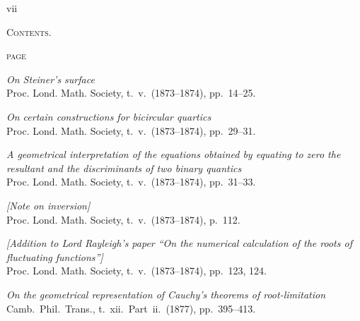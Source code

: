 \documentclass[11pt]{article}
\begin{document}
\thispagestyle{empty}
\begin{flushright}\small vii\end{flushright}
\vspace*{1em}
\begin{center}
{\Large\scshape Contents.}
\end{center}
\vspace*{1em}

\noindent\hfill\textsc{page}

\medskip

\begin{description}\itemsep=2pt
\item[556.] \textit{On Steiner's surface}\\
\hspace*{1em}\small Proc. Lond. Math. Society, t.~v.\ (1873--1874), pp.~14--25.

\item[557.] \textit{On certain constructions for bicircular quartics}\\
\hspace*{1em}\small Proc. Lond. Math. Society, t.~v.\ (1873--1874), pp.~29--31.

\item[558.] \textit{A geometrical interpretation of the equations obtained by equating to zero the resultant and the discriminants of two binary quantics}\\
\hspace*{1em}\small Proc. Lond. Math. Society, t.~v.\ (1873--1874), pp.~31--33.

\item[559.] \textit{[Note on inversion]}\\
\hspace*{1em}\small Proc. Lond. Math. Society, t.~v.\ (1873--1874), p.~112.

\item[560.] \textit{[Addition to Lord Rayleigh's paper ``On the numerical calculation of the roots of fluctuating functions'']}\\
\hspace*{1em}\small Proc. Lond. Math. Society, t.~v.\ (1873--1874), pp.~123, 124.

\item[561.] \textit{On the geometrical representation of Cauchy's theorems of root-limitation}\\
\hspace*{1em}\small Camb.\ Phil.\ Trans., t.~xii.\ Part~ii.\ (1877), pp.~395--413.


\end{description}
\end{document}
